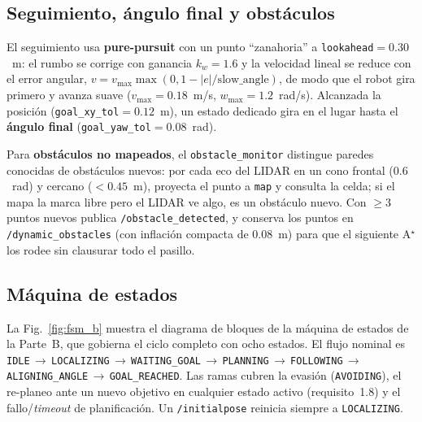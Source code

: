 \subsection{Seguimiento, ángulo final y obstáculos}
El seguimiento usa \textbf{pure-pursuit} \cite{purepursuit} con un punto ``zanahoria'' a \texttt{lookahead}$=0.30$~m: el rumbo se corrige con ganancia $k_w=1.6$ y la velocidad lineal se reduce con el error angular, $v=v_{\max}\max(0,1-|e|/\text{slow\_angle})$, de modo que el robot gira primero y avanza suave ($v_{\max}=0.18$~m/s, $w_{\max}=1.2$~rad/s). Alcanzada la posición (\texttt{goal\_xy\_tol}$=0.12$~m), un estado dedicado gira en el lugar hasta el \textbf{ángulo final} (\texttt{goal\_yaw\_tol}$=0.08$~rad).

Para \textbf{obstáculos no mapeados}, el \texttt{obstacle\_monitor} distingue paredes conocidas de obstáculos nuevos: por cada eco del LIDAR en un cono frontal ($0.6$~rad) y cercano ($<0.45$~m), proyecta el punto a \texttt{map} y consulta la celda; si el mapa la marca libre pero el LIDAR ve algo, es un obstáculo nuevo. Con $\geq 3$ puntos nuevos publica \texttt{/obstacle\_detected}, y conserva los puntos en \texttt{/dynamic\_obstacles} (con inflación compacta de $0.08$~m) para que el siguiente A$^\star$ los rodee sin clausurar todo el pasillo.

\subsection{Máquina de estados}
La Fig.~\ref{fig:fsm_b} muestra el diagrama de bloques de la máquina de estados de la Parte~B, que gobierna el ciclo completo con ocho estados. El flujo nominal es \texttt{IDLE}\,$\to$\,\allowbreak\texttt{LOCALIZING}\,$\to$\,\allowbreak\texttt{WAITING\_GOAL}\,$\to$\,\allowbreak\texttt{PLANNING}\,$\to$\,\allowbreak\texttt{FOLLOWING}\,$\to$\,\allowbreak\texttt{ALIGNING\_ANGLE}\,$\to$\,\allowbreak\texttt{GOAL\_REACHED}. Las ramas cubren la evasión (\texttt{AVOIDING}), el re-planeo ante un nuevo objetivo en cualquier estado activo (requisito~1.8) y el fallo/\emph{timeout} de planificación. Un \texttt{/initialpose} reinicia siempre a \texttt{LOCALIZING}.

